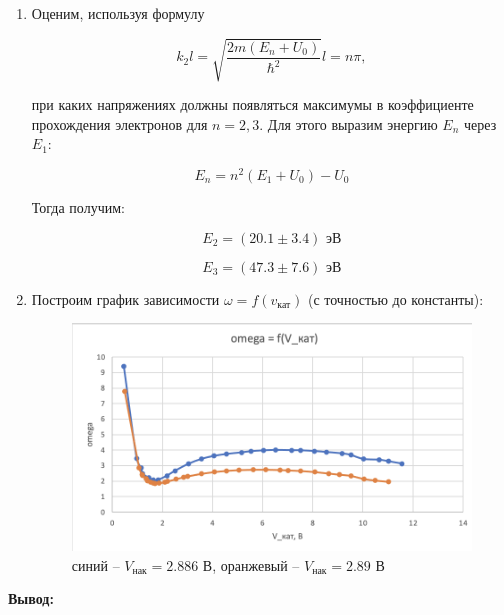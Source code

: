\documentclass[a4paper, 12pt]{article}%
\begin{document}
\begin{enumerate}
\item Оценим,  используя формулу

 \[k_2 l = \sqrt{\frac{2m(E_n + U_0)}{\hbar^2}}l = n \pi,\]
 
при каких напряжениях должны появляться максимумы в коэффициенте прохождения электронов для $n = 2, 3$.  Для этого выразим энергию $E_n$ через $E_1$:

\[E_n = n^2(E_1 + U_0) - U_0\]

Тогда получим:

\[E_2 = (20.1 \pm 3.4) \text{ эВ}\]

\[E_3 = (47.3 \pm 7.6) \text{ эВ}\]

\item Построим график зависимости $\omega = f(v_\text{кат})$ (с точностью до константы):

	\begin{figure}[h!]
		\centering
		\includegraphics[scale=0.8]{График_3.PNG}
		\caption{синий -- $V_{\text{нак}} = 2.886$ В,  оранжевый -- $V_{\text{нак}} = 2.89$ В}
	\end{figure}

\end{enumerate}

\textbf{Вывод:}\\\par
\end{document}
